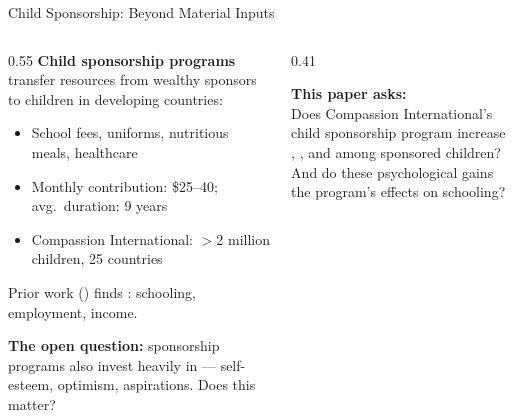 \documentclass[aspectratio=169, 10pt]{beamer}
\begin{document}
\begin{frame}{Child Sponsorship: Beyond Material Inputs}
  \begin{columns}
    \begin{column}{0.55\textwidth}
      \textbf{Child sponsorship programs} transfer resources from wealthy sponsors to children in developing countries:
      \begin{itemize}
        \item School fees, uniforms, nutritious meals, healthcare
        \item Monthly contribution: \$25--40; avg.\ duration: 9 years
        \item Compassion International: $>$2 million children, 25 countries
      \end{itemize}
      \vspace{0.7em}
      Prior work (\citealt{Wydick2013, Wydick2017}) finds : schooling, employment, income.

      \vspace{0.7em}
      \textbf{The open question:} sponsorship programs also invest heavily in  --- self-esteem, optimism, aspirations. Does this matter?
    \end{column}
    \begin{column}{0.41\textwidth}
      \begin{keybox}
        \textbf{This paper asks:}\\[0.4em]
        Does Compassion International's child sponsorship program increase , , and  among sponsored children?\\[0.5em]
        And do these psychological gains  the program's effects on schooling?
      \end{keybox}
    \end{column}
  \end{columns}
\end{frame}
\end{document}
